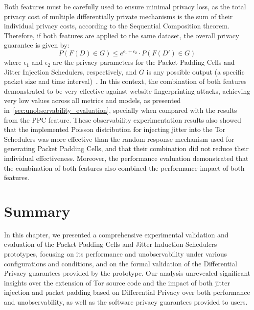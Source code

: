 
Both features must be carefully used to ensure minimal privacy loss, as the total privacy cost of multiple differentially private mechanisms is the sum of their individual privacy costs, according to the Sequential Composition theorem. Therefore, if both features are applied to the same dataset, the overall privacy guarantee is given by:
\[P(F(D) \in G) \leq e^{\epsilon_1 + \epsilon_2} \cdot P(F(D') \in G)\]
where $\epsilon_1$ and $\epsilon_2$ are the privacy parameters for the Packet Padding Cells and Jitter Injection Schedulers, respectively, and $G$ is any possible output (a specific packet size and time interval)~\cite{DP_Book, AlgFoundationsDP}.
In this context, the combination of both features demonstrated to be very effective against website fingerprinting attacks, achieving very low values across all metrics and models, as presented in~\autoref{sec:unobservability_evaluation}, specially when compared with the results from the PPC feature.
These observability experimentation results also showed that the implemented Poisson distribution for injecting jitter into the Tor Schedulers was more effective than the random response mechanism used for generating Packet Padding Cells, and that their combination did not reduce their individual effectiveness.
Moreover, the performance evaluation demonstrated that the combination of both features also combined the performance impact of both features. 

\section{Summary}\label{sec:validation_summary} %

In this chapter, we presented a comprehensive experimental validation and evaluation of the Packet Padding Cells and Jitter Induction Schedulers prototypes, focusing on its performance and unobservability under various configurations and conditions, and on the formal validation of the Differential Privacy guarantees provided by the prototype. Our analysis unrevealed significant insights over the extension of Tor source code and the impact of both jitter injection and packet padding based on Differential Privacy over both performance and unobservability, as well as the software privacy guarantees provided to users. 

